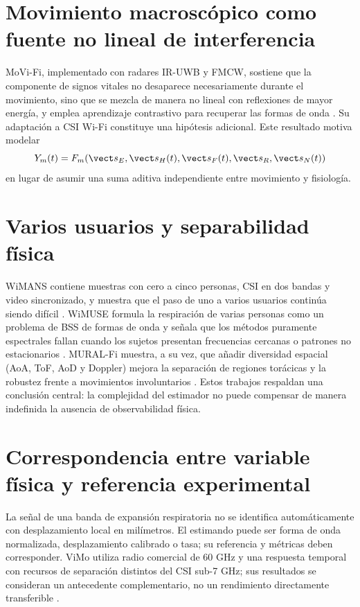\section{Movimiento macroscópico como fuente no lineal de interferencia}

MoVi-Fi, implementado con radares IR-UWB y FMCW, sostiene que la componente de signos vitales no desaparece necesariamente durante el movimiento, sino que se mezcla de manera no lineal con reflexiones de mayor energía, y emplea aprendizaje contrastivo para recuperar las formas de onda \citep{Chen2022MoViFi}. Su adaptación a CSI Wi-Fi constituye una hipótesis adicional. Este resultado motiva modelar
\begin{equation}
Y_m(t)=F_m(\vect s_E,\vect s_H(t),\vect s_F(t),
\vect s_R,\vect s_N(t))
\end{equation}
en lugar de asumir una suma aditiva independiente entre movimiento y fisiología.

\section{Varios usuarios y separabilidad física}

WiMANS contiene muestras con cero a cinco personas, CSI en dos bandas y video sincronizado, y muestra que el paso de uno a varios usuarios continúa siendo difícil \citep{Huang2024WiMANS}. WiMUSE formula la respiración de varias personas como un problema de \ac{BSS} de formas de onda y señala que los métodos puramente espectrales fallan cuando los sujetos presentan frecuencias cercanas o patrones no estacionarios \citep{Yi2025WiMUSE}. MURAL-Fi muestra, a su vez, que añadir diversidad espacial (AoA, ToF, AoD y Doppler) mejora la separación de regiones torácicas y la robustez frente a movimientos involuntarios \citep{Li2026MURALFI}. Estos trabajos respaldan una conclusión central: la complejidad del estimador no puede compensar de manera indefinida la ausencia de observabilidad física.

\section{Correspondencia entre variable física y referencia experimental}

La señal de una banda de expansión respiratoria no se identifica automáticamente
con desplazamiento local en milímetros. El estimando puede ser forma de onda
normalizada, desplazamiento calibrado o tasa; su referencia y métricas deben
corresponder. ViMo utiliza radio comercial de 60 GHz y una respuesta temporal
con recursos de separación distintos del CSI sub-7 GHz; sus resultados se
consideran un antecedente complementario, no un rendimiento directamente
transferible \citep{Wang2020ViMo}.

